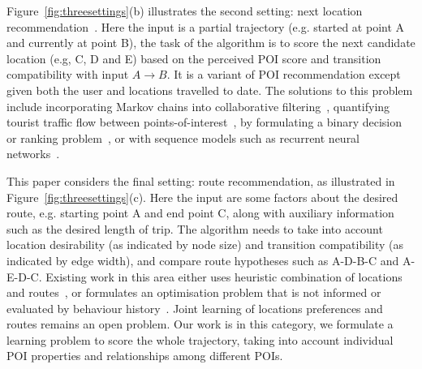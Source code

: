 Figure~\ref{fig:threesettings}(b) illustrates the second setting: next location recommendation~\cite{ijcai13,aaai16,baraglia2013learnext,zhang2015location}. Here the input is a partial trajectory (e.g. started at point A and currently at point B), the task of the algorithm is to score the next candidate location (e.g, C, D and E) based on the perceived POI score and transition compatibility with input $A\rightarrow B$.
It is a variant of POI recommendation except given both the user and locations travelled to date. The solutions to this problem include incorporating Markov chains into collaborative filtering~\cite{fpmc10,ijcai13,zhang2015location},
quantifying tourist traffic flow between points-of-interest~\cite{zheng2012patterns},
by formulating a binary decision or ranking problem~\cite{baraglia2013learnext}, or with sequence models such as recurrent neural networks~\cite{aaai16}.



This paper considers the final setting: route recommendation, as illustrated in Figure~\ref{fig:threesettings}(c). Here the input are some factors about the desired route, e.g. starting point A and end point C, along with auxiliary information such as the desired length of trip. The algorithm needs to take into account location desirability (as indicated by node size) and transition compatibility (as indicated by edge width), and compare route hypotheses such as A-D-B-C and A-E-D-C. Existing work in this area either uses heuristic combination of locations and routes~\cite{lu2010photo2trip,ijcai15,lu2012personalized}, or formulates an optimisation problem that is not informed or evaluated by behaviour history~\cite{gioniswsdm14,chen2015tripplanner}. Joint learning of locations preferences and routes remains an open problem.
Our work is in this category, we formulate a learning problem to score the whole trajectory, taking into account individual POI properties and relationships among different POIs.



